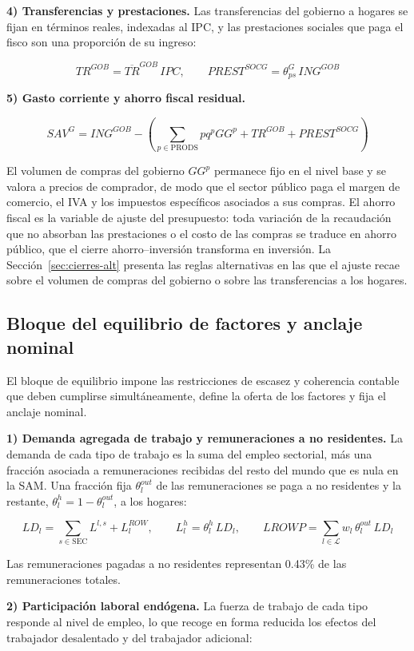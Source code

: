 \documentclass[11pt]{article}
\begin{document}
\textbf{4) Transferencias y prestaciones.} Las transferencias del gobierno a hogares se fijan en términos reales, indexadas al IPC, y las prestaciones sociales que paga el fisco son una proporción de su ingreso:

\[
TR^{GOB}=\overline{TR}^{GOB}\,IPC,\qquad PREST^{SOCG}=\theta_{ps}^{G}\,ING^{GOB}
\]

\textbf{5) Gasto corriente y ahorro fiscal residual.}

\[
SAV^{G}=ING^{GOB}-\left(\sum_{p\in\mathrm{PRODS}}pq^{p}GG^{p}+TR^{GOB}+PREST^{SOCG}\right)
\]

El volumen de compras del gobierno $GG^{p}$ permanece fijo en el nivel base y se valora a precios de comprador, de modo que el sector público paga el margen de comercio, el IVA y los impuestos específicos asociados a sus compras. El ahorro fiscal es la variable de ajuste del presupuesto: toda variación de la recaudación que no absorban las prestaciones o el costo de las compras se traduce en ahorro público, que el cierre ahorro--inversión transforma en inversión. La Sección~\ref{sec:cierres-alt} presenta las reglas alternativas en las que el ajuste recae sobre el volumen de compras del gobierno o sobre las transferencias a los hogares.

\subsection{Bloque del equilibrio de factores y anclaje nominal}
\label{sec:equilibrio}

El bloque de equilibrio impone las restricciones de escasez y coherencia contable que deben cumplirse simultáneamente, define la oferta de los factores y fija el anclaje nominal.

\textbf{1) Demanda agregada de trabajo y remuneraciones a no residentes.} La demanda de cada tipo de trabajo es la suma del empleo sectorial, más una fracción asociada a remuneraciones recibidas del resto del mundo que es nula en la SAM. Una fracción fija $\theta^{out}_{l}$ de las remuneraciones se paga a no residentes y la restante, $\theta^{h}_{l}=1-\theta^{out}_{l}$, a los hogares:

\[
LD_{l}=\sum_{s\in \mathrm{SEC}}L^{l,s}+L^{ROW}_{l},\qquad
L^{h}_{l}=\theta^{h}_{l}\,LD_{l},\qquad
LROWP=\sum_{l\in\mathcal{L}}w_{l}\,\theta^{out}_{l}\,LD_{l}
\]

Las remuneraciones pagadas a no residentes representan 0.43\% de las remuneraciones totales.

\textbf{2) Participación laboral endógena.} La fuerza de trabajo de cada tipo responde al nivel de empleo, lo que recoge en forma reducida los efectos del trabajador desalentado y del trabajador adicional:
\end{document}
